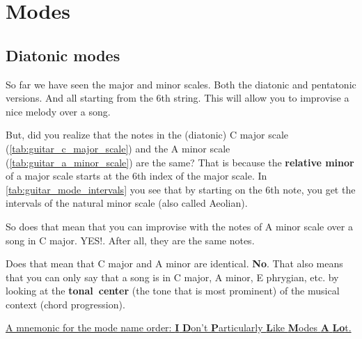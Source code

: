 \section{Modes} \label{sec:modes}

\subsection{Diatonic modes}

So far we have seen the major and minor scales. Both the diatonic and pentatonic versions. And all starting from the 6th string. This will allow you to improvise a nice melody over a song.

But, did you realize that the notes in the (diatonic) C major scale (\autoref{tab:guitar_c_major_scale}) and the A minor scale (\autoref{tab:guitar_a_minor_scale}) are the same? That is because the \textbf{relative minor} of a major scale starts at the 6th index of the major scale. In \autoref{tab:guitar_mode_intervals} you see that by starting on the 6th note, you get the intervals of the natural minor scale (also called \textnormal{A}eolian).

So d\textnormal{o}es that mean that you can improvise with the notes of A minor scale over a song in C major. YES!. After all, they are the same notes.

D\textnormal{o}es that mean that C major and A minor are identical. \textbf{No}. That also means that you can only say that a song is in C major, A minor, E phrygian, etc. by looking at the \mbox{\textbf{tonal center}} (the tone that is most prominent) of the musical context (chord progression). 

\underline{A mnemonic for the mode name order: \textbf{I} \textbf{D}on't \textbf{P}articularly \textbf{L}ike \textbf{M}odes \textbf{A} \textbf{Lo}t.}

